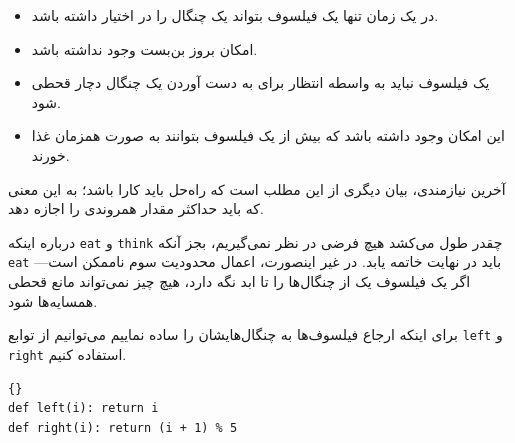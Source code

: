 \documentclass{book}
\begin{document}
\begin{itemize}

\item 
    در یک زمان تنها یک فیلسوف بتواند یک چنگال را در اختیار داشته باشد. 

\item 
    امکان بروز بن‌بست وجود نداشته باشد. 

\item 
    یک فیلسوف نباید به واسطه انتظار برای به دست آوردن یک چنگال دچار قحطی شود. 

\item 
    این امکان وجود داشته باشد که بیش از یک فیلسوف بتوانند به صورت همزمان غذا خورند. 

\end{itemize}

    آخرین نیازمندی، بیان دیگری از این مطلب است که راه‌حل باید کارا باشد؛ به این معنی که باید حداکثر مقدار همروندی را اجازه دهد. 

    درباره اینکه {\tt eat} و {\tt think} چقدر طول می‌کشد هیچ فرضی  در نظر نمی‌گیریم، بجز آنکه {\tt eat}  باید در نهایت خاتمه یابد. 
    در غیر اینصورت، اعمال محدودیت سوم ناممکن است---اگر یک فیلسوف یک از چنگال‌ها را تا ابد نگه دارد، هیچ چیز نمی‌تواند مانع قحطی همسایه‌ها شود. 
    

    برای اینکه ارجاع فیلسوف‌ها به چنگال‌هایشان را ساده نماییم می‌توانیم از توابع {\tt left} و {\tt right} استفاده کنیم. 

\begin{latin}
\begin{lstlisting}[title=\rl{کدام چنگال؟}]{}
def left(i): return i
def right(i): return (i + 1) % 5
\end{lstlisting}
\end{latin}
\end{document}
